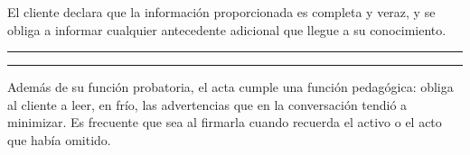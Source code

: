 \begin{escrito}
\medskip
\noindent El cliente declara que la información proporcionada es completa y veraz, y se
obliga a informar cualquier antecedente adicional que llegue a su conocimiento.

\medskip
\noindent\hfill\rule{5cm}{0.4pt}\hspace{1cm}\rule{5cm}{0.4pt}\hfill\null

\noindent\hspace{1.5cm}{\footnotesize Cliente}\hspace{5.2cm}{\footnotesize Abogado}
\end{escrito}

\begin{practica}
Además de su función probatoria, el acta cumple una función pedagógica: obliga al cliente
a leer, en frío, las advertencias que en la conversación tendió a minimizar. Es frecuente
que sea al firmarla cuando recuerda el activo o el acto que había omitido.
\end{practica}
